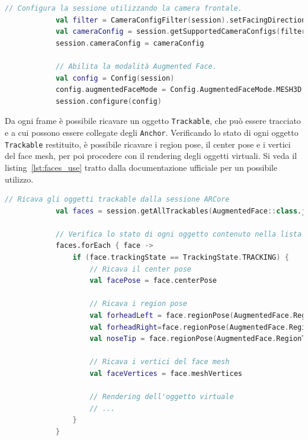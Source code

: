 \documentclass[crop=false, class=book]{standalone}
\begin{document}
	\begin{center}
		\begin{minipage}{0.95\textwidth}
			\begin{lstlisting}[caption={Configurazione della modalità Augmented Face.}, label={lst:af_session}, language=Kotlin]
			// Configura la sessione utilizzando la camera frontale.
			val filter = CameraConfigFilter(session).setFacingDirection(CameraConfig.FacingDirection.FRONT)
			val cameraConfig = session.getSupportedCameraConfigs(filter)[0]
			session.cameraConfig = cameraConfig
			
			// Abilita la modalità Augmented Face.
			val config = Config(session)
			config.augmentedFaceMode = Config.AugmentedFaceMode.MESH3D
			session.configure(config)
			\end{lstlisting}
		\end{minipage}
	\end{center}
	Da ogni frame è possibile ricavare un oggetto \verb|Trackable|, che può essere tracciato e a cui possono essere collegate degli \verb|Anchor|. Verificando lo stato di ogni oggetto \verb|Trackable| restituito, è possibile ricavare i region pose, il center pose e i vertici del face mesh, per poi procedere con il rendering degli oggetti virtuali. Si veda il listing~\vref{lst:faces_use} tratto dalla documentazione ufficiale per un possibile utilizzo.
	
	\begin{center}
		\begin{minipage}{0.95\textwidth}
			\begin{lstlisting}[caption={Utilizzo della modalità Augmented Faces.}, label={lst:faces_use}, language=Kotlin]
			// Ricava gli oggetti trackable dalla sessione ARCore
			val faces = session.getAllTrackables(AugmentedFace::class.java)
			
			// Verifica lo stato di ogni oggetto contenuto nella lista di Trackable
			faces.forEach { face ->
				if (face.trackingState == TrackingState.TRACKING) {
					// Ricava il center pose
					val facePose = face.centerPose
					
					// Ricava i region pose
					val forheadLeft = face.regionPose(AugmentedFace.RegionType.FOREHEAD_LEFT)
					val forheadRight=face.regionPose(AugmentedFace.RegionType.FOREHEAD_RIGHT)
					val noseTip = face.regionPose(AugmentedFace.RegionType.NOSE_TIP)
					
					// Ricava i vertici del face mesh
					val faceVertices = face.meshVertices
					
					// Rendering dell'oggetto virtuale
					// ...
				}
			}
			\end{lstlisting}
		\end{minipage}
	\end{center}
	


	
	
\end{document}

